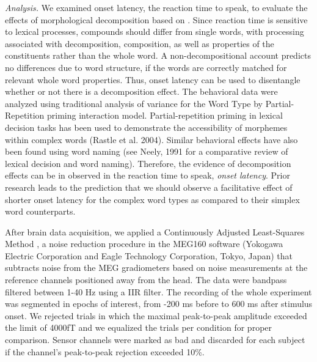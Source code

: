 \documentclass{frontiersSCNS}
\begin{document}
\textit{Analysis.} We examined onset latency, the reaction time to speak, to evaluate the effects of morphological decomposition based on \citep{Fiorentino:2007}. Since reaction time is sensitive to lexical processes, compounds should differ from single words, with processing associated with decomposition, composition, as well as properties of the constituents rather than the whole word. A non-decompositional account predicts no differences due to word structure, if the words are correctly matched for relevant whole word properties. Thus, onset latency can be used to disentangle whether or not there is a decomposition effect. The behavioral data were analyzed using traditional analysis of variance for the Word Type by Partial-Repetition priming interaction model.
Partial-repetition priming in lexical decision tasks has been used to demonstrate the accessibility of morphemes within complex words (Rastle et al. 2004). Similar behavioral effects have also been found using word naming (see Neely, 1991 for a comparative review of lexical decision and word naming). Therefore, the evidence of decomposition effects can be in observed in the reaction time to speak, \textit{onset latency}. Prior research leads to the prediction that we should observe a facilitative effect of shorter onset latency for the complex word types as compared to their simplex word counterparts. 


After brain data acquisition, we applied a Continuously Adjusted Least-Squares Method \citep{Adachi:2001}, a noise reduction procedure in the MEG160 software (Yokogawa Electric Corporation and Eagle Technology Corporation, Tokyo, Japan) that subtracts noise from the MEG gradiometers based on noise measurements at the reference channels positioned away from the head.  The data were bandpass filtered between 1-40 Hz using a IIR filter.  The recording of the whole experiment was segmented in epochs of interest, from -200 ms before to 600 ms after stimulus onset.  We rejected trials in which the maximal peak-to-peak amplitude exceeded the limit of 4000fT and we equalized the trials per condition for proper comparison. Sensor channels were marked as bad and discarded for each subject if the channel’s peak-to-peak rejection exceeded 10\%. 
\end{document}
